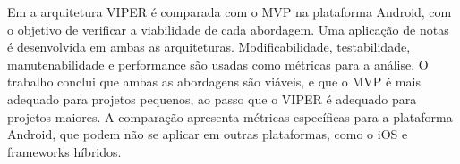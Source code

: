 Em \cite{humeniuk} a arquitetura VIPER é comparada com o MVP na plataforma Android, com o objetivo de verificar a viabilidade de cada abordagem.
Uma aplicação de notas é desenvolvida em ambas as arquiteturas.
Modificabilidade, testabilidade, manutenabilidade e performance são usadas como métricas para a análise.
O trabalho conclui que ambas as abordagens são viáveis, e que o MVP é mais adequado para projetos pequenos, ao passo que o VIPER é adequado para projetos maiores.
A comparação apresenta métricas específicas para a plataforma Android, que podem não se aplicar em outras plataformas, como o iOS e frameworks híbridos.